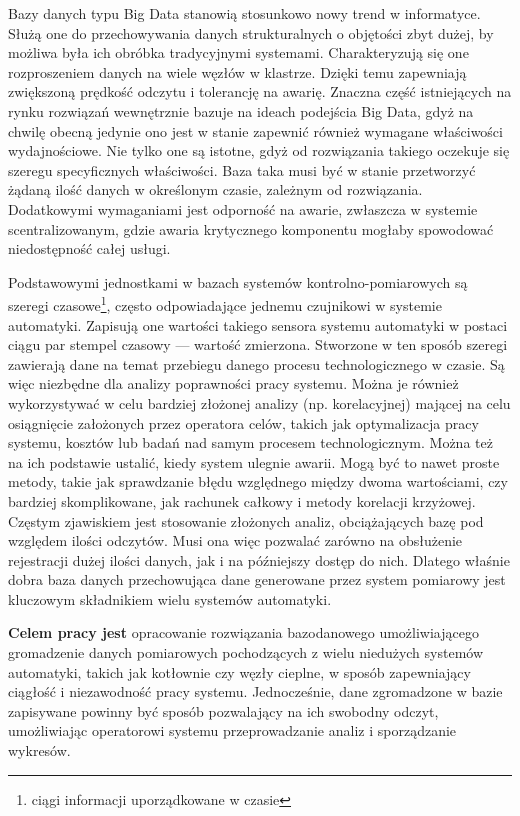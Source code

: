 \documentclass[a4paper,polish,12pt,twoside]{article}
\begin{document}
Bazy danych typu Big Data stanowią stosunkowo nowy trend w informatyce. Służą one do przechowywania danych strukturalnych o objętości zbyt dużej, by możliwa była ich obróbka tradycyjnymi systemami. Charakteryzują się one rozproszeniem danych na wiele węzłów w klastrze. Dzięki temu zapewniają zwiększoną prędkość odczytu i tolerancję na awarię. Znaczna część istniejących na rynku rozwiązań wewnętrznie bazuje na ideach podejścia Big Data, gdyż na chwilę obecną jedynie ono jest w stanie zapewnić również wymagane właściwości wydajnościowe. Nie tylko one są istotne, gdyż od rozwiązania takiego oczekuje się szeregu specyficznych właściwości. Baza taka musi być w stanie przetworzyć żądaną ilość danych w określonym czasie, zależnym od rozwiązania. Dodatkowymi wymaganiami jest odporność na awarie, zwłaszcza w systemie scentralizowanym, gdzie awaria krytycznego komponentu mogłaby spowodować niedostępność całej usługi.

Podstawowymi jednostkami w bazach systemów kontrolno-pomiarowych są szeregi czasowe\footnote{ciągi informacji uporządkowane w czasie}, często odpowiadające jednemu czujnikowi w systemie automatyki. Zapisują one wartości takiego sensora systemu automatyki w postaci ciągu par stempel czasowy --- wartość zmierzona. Stworzone w ten sposób szeregi zawierają dane na temat przebiegu danego procesu technologicznego w czasie. Są więc niezbędne dla analizy poprawności pracy systemu. Można je również wykorzystywać w celu bardziej złożonej analizy (np. korelacyjnej) mającej na celu osiągnięcie założonych przez operatora celów, takich jak optymalizacja pracy systemu, kosztów lub badań nad samym procesem technologicznym. Można też na ich podstawie ustalić, kiedy system ulegnie awarii. Mogą być to nawet proste metody, takie jak sprawdzanie błędu względnego między dwoma wartościami, czy bardziej skomplikowane, jak rachunek całkowy i metody korelacji krzyżowej. Częstym zjawiskiem jest stosowanie złożonych analiz, obciążających bazę pod względem ilości odczytów. Musi ona więc pozwalać zarówno na obsłużenie rejestracji dużej ilości danych, jak i na późniejszy dostęp do nich. Dlatego właśnie dobra baza danych przechowująca dane generowane przez system pomiarowy jest kluczowym składnikiem wielu systemów automatyki. 

\textbf{Celem pracy jest} opracowanie rozwiązania bazodanowego umożliwiającego gromadzenie danych pomiarowych pochodzących z wielu niedużych systemów automatyki, takich jak kotłownie czy węzły cieplne, w sposób zapewniający ciągłość i niezawodność pracy systemu. Jednocześnie, dane zgromadzone w bazie zapisywane powinny być sposób pozwalający na ich swobodny odczyt, umożliwiając operatorowi systemu przeprowadzanie analiz i sporządzanie wykresów.
\end{document}
